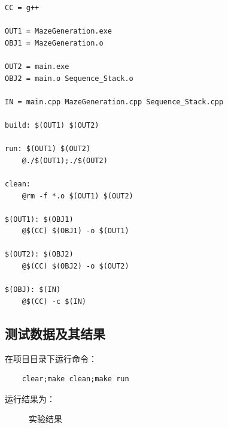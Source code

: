 \documentclass[a4paper,11pt,UTF8]{ctexart}
\begin{document}
\begin{lstlisting}[caption=Makefile, captionpos=b]
CC = g++

OUT1 = MazeGeneration.exe
OBJ1 = MazeGeneration.o

OUT2 = main.exe
OBJ2 = main.o Sequence_Stack.o

IN = main.cpp MazeGeneration.cpp Sequence_Stack.cpp

build: $(OUT1) $(OUT2)

run: $(OUT1) $(OUT2)
    @./$(OUT1);./$(OUT2)

clean:
    @rm -f *.o $(OUT1) $(OUT2)

$(OUT1): $(OBJ1)
    @$(CC) $(OBJ1) -o $(OUT1)

$(OUT2): $(OBJ2)
    @$(CC) $(OBJ2) -o $(OUT2)

$(OBJ): $(IN)
    @$(CC) -c $(IN)
\end{lstlisting}

\subsection{测试数据及其结果}

在项目目录下运行命令：
\begin{lstlisting}
    clear;make clean;make run
\end{lstlisting}

运行结果为：

\begin{figure}[htbp] %
    \centering
        \caption{实验结果}
    \end{figure}
\end{document}
